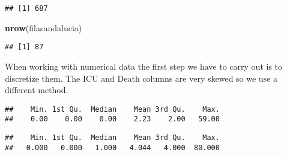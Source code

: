 \documentclass[
]{book}
\newenvironment{Shaded}{\begin{snugshade}}{\end{snugshade}}
\newcommand{\KeywordTok}[1]{\textcolor[rgb]{0.13,0.29,0.53}{\textbf{#1}}}
\newcommand{\NormalTok}[1]{#1}
\newcommand{\OperatorTok}[1]{\textcolor[rgb]{0.81,0.36,0.00}{\textbf{#1}}}
\begin{document}
\begin{verbatim}
## [1] 687
\end{verbatim}

\begin{Shaded}
\begin{Highlighting}[]
\KeywordTok{nrow}\NormalTok{(filasandalucia)}
\end{Highlighting}
\end{Shaded}

\begin{verbatim}
## [1] 87
\end{verbatim}

When working with numerical data the first step we have to carry out is to discretize them. The ICU and Death columns are very skewed so we use a different method.

\begin{Shaded}
\end{Shaded}

\begin{verbatim}
##    Min. 1st Qu.  Median    Mean 3rd Qu.    Max. 
##    0.00    0.00    0.00    2.23    2.00   59.00
\end{verbatim}

\begin{Shaded}
\end{Shaded}

\begin{verbatim}
##    Min. 1st Qu.  Median    Mean 3rd Qu.    Max. 
##   0.000   0.000   1.000   4.044   4.000  80.000
\end{verbatim}
\end{document}
